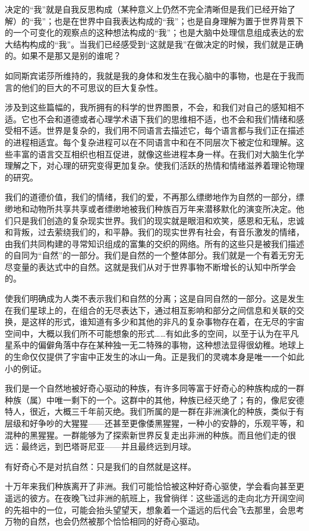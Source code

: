    决定的“我”就是自我反思构成（某种意义上仍然不完全清晰但是我们已经开始了解）的“我”；也是在世界中自我表达构成的“我”；也是自身理解为置于世界背景下的一个可变化的观察点的这种想法构成的“我”；也是大脑中处理信息组成表达的宏大结构构成的“我”。当我们已经感受到“这就是我”在做决定的时候，我们就是正确的。如果不是那又是别的谁呢？

   如同斯宾诺莎所维持的，我就是我的身体和发生在我心脑中的事物，也是在于我而言的他们的巨大的不可思议的巨大复杂性。

   涉及到这些篇幅的，我所拥有的科学的世界图景，不会，和我们对自己的感知相不适。它也不会和道德或者心理学术语下我们的思维相不适，也不会和我们情绪和感受相不适。世界是复杂的，我们用不同语言去描述它，每个语言都与我们正在描述的进程相适宜。每个复杂进程可以在不同语言中和在不同层次下被定位和理解。这些丰富的语言交互相织也相互促进，就像这些进程本身一样。在我们对大脑生化学理解之下，对心理的研究变得更加复杂。使我们活跃的热情和情绪滋养着理论物理的研究。

   我们的道德价值，我们的情绪，我们的爱，不再那么缥缈地作为自然的一部分，缥缈地和动物所共享共享或者缥缈地被我们种族百万年来潜移默化的演变所决定。他们只是我们创造的复杂现实世界。我们的现实就是眼泪和欢笑，感恩和无私，忠诚和背叛，过去萦绕我们的，和平静。我们的现实世界有社会，有音乐激发的情绪，由我们共同构建的寻常知识组成的富集的交织的网络。所有的这些只是被我们描述的自同为“自然”的一部分。我们是自然的一个整体部分。我们就是一个有着无穷无尽变量的表达式中的自然。这就是我们从对于世界事物不断增长的认知中所学会的。

   使我们明确成为人类不表示我们和自然的分离；这是自同自然的一部分。这是发生在我们星球上的，在组合的无尽表达下，通过相互影响和部分之间信息和关联的交换，是这样的形式，谁知道有多少和其他的非凡的复杂事物存在着，在无尽的宇宙空间中，大概以我们所不可能想象的形式……有如此多的空间，以至于认为在平凡星系中的偏僻角落中存在某种独一无二特殊的事物，这种想法显得很幼稚。地球上的生命仅仅提供了宇宙中正发生的冰山一角。正是我们的灵魂本身是唯一一个如此小的例证。

   我们是一个自然地被好奇心驱动的种族，有许多同等富于好奇心的种族构成的一群种族（属）中唯一剩下的一个。这群中的其他，种族已经灭绝了；有的，像尼安德特人，很近，大概三千年前灭绝。我们所属的是一群在非洲演化的种族，类似于有层级和好争吵的大猩猩——还甚至更像倭黑猩猩，一种小的安静的，乐观平等，和混种的黑猩猩。一群能够为了探索新世界反复走出非洲的种族。而且他们走的很远：最终远，到巴塔哥尼亚——并且最终远到月球。

   有好奇心不是对抗自然：只是我们的自然就是这样。

   十万年来我们种族离开了非洲。我们可能恰恰被这种好奇心驱使，学会看向甚至更遥远的彼方。在夜晚飞过非洲的航班上，我曾徜徉：这些遥远的走向北方开阔空间的先祖中的一位，可能会抬头望望天，想象着一个遥远的后代会飞去那里，会思考万物的自然，也会仍然被那个恰恰相同的好奇心驱动。

